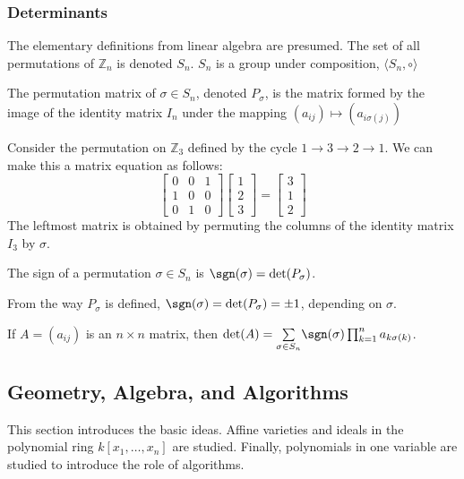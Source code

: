 \documentclass[crop=false,class=book,oneside]{standalone}
\begin{document}
\subsubsection{Determinants}
The elementary definitions from linear algebra are presumed. The set of all permutations of $\mathbb{Z}_{n}$ is denoted $S_n$. $S_{n}$ is a group under composition, $\langle S_{n},\circ\rangle$
\begin{definition}
The permutation matrix of $\sigma \in S_{n}$, denoted $P_{\sigma}$, is the matrix formed by the image of the identity matrix $I_{n}$ under the mapping $(a_{ij})\mapsto (a_{i\sigma(j)})$
\end{definition}
\begin{example}
Consider the permutation on $\mathbb{Z}_3$ defined by the cycle $1\rightarrow 3 \rightarrow 2 \rightarrow 1$. We can make this a matrix equation as follows:
\begin{equation*}
    \begin{bmatrix} 0 & 0 & 1 \\ 1 & 0 & 0 \\ 0 & 1 & 0 \end{bmatrix} \begin{bmatrix} 1 \\ 2 \\ 3 \end{bmatrix} = \begin{bmatrix} 3 \\ 1 \\ 2 \end{bmatrix}    
\end{equation*}
The leftmost matrix is obtained by permuting the columns of the identity matrix $I_{3}$ by $\sigma$.
\end{example}
\begin{definition}
The sign of a permutation $\sigma\in S_{n}$ is $\sgn(\sigma) = \det(P_{\sigma})$.
\end{definition}
\begin{remark}
From the way $P_{\sigma}$ is defined, $\sgn(\sigma) = \det(P_{\sigma}) = \pm 1$, depending on $\sigma$.
\end{remark}
\begin{theorem}
If $A=(a_{ij})$ is an $n\times n$ matrix, then $\det(A) = \underset{\sigma \in S_n}\sum \sgn(\sigma) \prod_{k=1}^{n} a_{k\sigma(k)}$.
\end{theorem}
\subsection{Geometry, Algebra, and Algorithms}
This section introduces the basic ideas. Affine varieties and ideals in the polynomial ring $k[x_1,\hdots ,x_n]$ are studied. Finally, polynomials in one variable are studied to introduce the role of algorithms.
\end{document}
